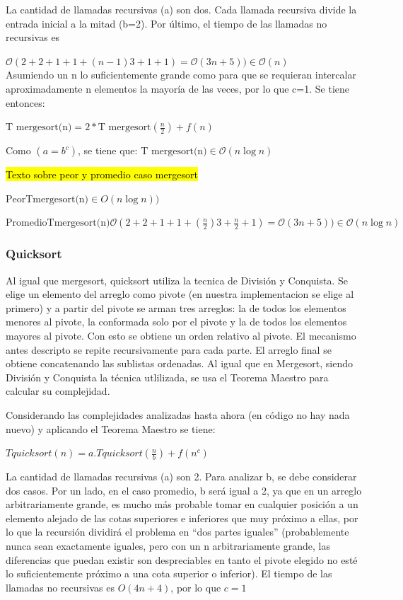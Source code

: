\documentclass[article,a4paper]{article}
\begin{document}
La cantidad de llamadas recursivas (a) son dos. Cada llamada recursiva divide la entrada inicial a la mitad (b=2). Por último, el tiempo de las llamadas no recursivas es 

$\mathcal O(2 + 2 + 1 + 1 + (n-1) 3 + 1 + 1) = \mathcal O(3n + 5)) \in \mathcal O(n)$\\

Asumiendo un n lo suficientemente grande como para que se requieran intercalar aproximadamente n elementos la mayoría de las veces, por lo que c=1. Se tiene entonces:

$\mbox{T mergesort(n)} = 2 * \mbox{T mergesort} (\frac{n}{2}) + f(n)$

Como $(a = b^c)$, se tiene que: $\mbox{T mergesort(n)} \in \mathcal O(n \log n)$

\hl{Texto sobre peor y promedio caso mergesort}

$\mbox{PeorTmergesort(n)} \in O(n \log n))$

$\mbox{PromedioTmergesort(n)} \mathcal O(2 + 2 + 1 + 1 + (\frac n 2) 3 + \frac n 2 + 1) = \mathcal O(3n + 5)) \in \mathcal O(n \log n)$ \\

\subsubsection{Quicksort}

Al igual que mergesort, quicksort utiliza la tecnica de División y Conquista. Se elige un elemento del arreglo como pivote (en nuestra implementacion se elige al primero) y a partir del pivote se arman tres arreglos: la de todos los elementos menores al pivote, la conformada solo por el pivote y la de todos los elementos mayores al pivote. Con esto se obtiene un orden relativo al pivote. El mecanismo antes descripto se repite recursivamente para cada parte. El arreglo final se obtiene concatenando las sublistas ordenadas. Al igual que en Mergesort, siendo División y Conquista la técnica utlilizada, se usa el Teorema Maestro para calcular su complejidad.

Considerando las complejidades analizadas hasta ahora (en código no hay nada nuevo) y aplicando el Teorema Maestro se tiene:

$Tquicksort(n) = a.Tquicksort(\frac{n}{b}) + f(n^c)$

La cantidad de llamadas recursivas (a) son 2. Para analizar b, se debe considerar dos casos. Por un lado, en el caso promedio, b será igual a 2, ya que en un arreglo arbitrariamente grande, es mucho más probable tomar en cualquier posición a un elemento alejado de las cotas superiores e inferiores que muy próximo a ellas, por lo que la recursión dividirá el problema en “dos partes iguales” (probablemente nunca sean exactamente iguales, pero con un n arbitrariamente grande, las diferencias que puedan existir son despreciables en tanto el pivote elegido no esté lo suficientemente próximo a una cota superior o inferior). El tiempo de las llamadas no recursivas es $O(4n + 4)$, por lo que $c=1$
\end{document}
